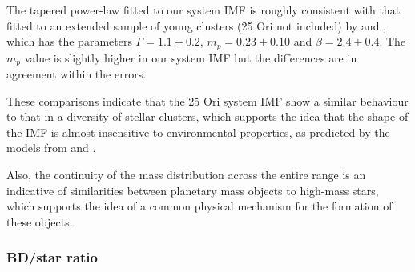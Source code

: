 \documentclass[12pt]{article}
\begin{document}
The tapered power-law fitted to our system IMF is roughly consistent with that fitted to an extended sample of young clusters (25 Ori not included) by \citet{DeMarchi2010} and \citet{Bastian2010}, which has the parameters $\Gamma=1.1\pm0.2$, $m_p=0.23\pm0.10$ and $\beta=2.4\pm0.4$. The $m_p$ value is slightly higher in our system IMF but the differences are in agreement within the errors.

These comparisons indicate that the 25 Ori system IMF show a similar behaviour to that in a diversity of stellar clusters, which supports the idea that the shape of the IMF is almost insensitive to environmental properties, as predicted by the models from \citet{Bonnell2006} and \citet{Elmegreen2008}.

Also, the continuity of the mass distribution across the entire range is an indicative of similarities between planetary mass objects to high-mass stars, which supports the idea of a common physical mechanism for the formation of these objects.

\subsubsection{BD/star ratio}
\label{sec_IMF:BD_star_ratio}
\end{document}
